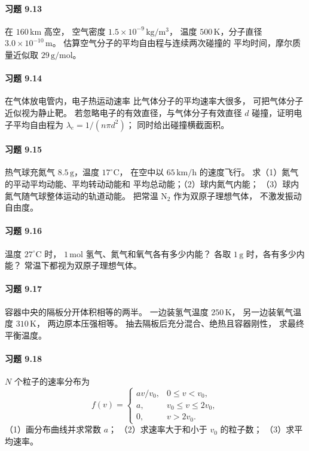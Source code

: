 \paragraph{习题 9.13}
在 \(160\,\mathrm{km}\) 高空，
空气密度 \(1.5\times10^{-9}\,\mathrm{kg/m^3}\)，
温度 \(500\,\mathrm K\)，分子直径
\(3.0\times10^{-10}\,\mathrm m\)。
估算空气分子的平均自由程与连续两次碰撞的
平均时间，摩尔质量近似取 \(29\,\mathrm{g/mol}\)。

\paragraph{习题 9.14}
在气体放电管内，电子热运动速率
比气体分子的平均速率大很多，
可把气体分子近似视为静止靶。
若忽略电子的有效直径，与气体分子有效直径
\(d\) 碰撞，证明电子平均自由程为
\(\lambda_e=1/(n\pi d^2)\)；
同时给出碰撞横截面积。

\paragraph{习题 9.15}
热气球充氮气 \(8.5\,\mathrm g\)，温度
\(17^\circ\mathrm C\)，
在空中以 \(65\,\mathrm{km/h}\) 的速度飞行。
求（1）氮气的平动平均动能、平均转动动能和
平均总动能；（2）球内氮气内能；
（3）球内氮气随气球整体运动的轨道动能。
把常温 \(\mathrm{N_2}\) 作为双原子理想气体，
不激发振动自由度。

\paragraph{习题 9.16}
温度 \(27^\circ\mathrm C\) 时，
\(1\,\mathrm{mol}\) 氢气、氮气和氧气各有多少内能？
各取 \(1\,\mathrm g\) 时，各有多少内能？
常温下都视为双原子理想气体。

\paragraph{习题 9.17}
容器中央的隔板分开体积相等的两半。
一边装氢气温度 \(250\,\mathrm K\)，
另一边装氧气温度 \(310\,\mathrm K\)，
两边原本压强相等。
抽去隔板后充分混合、绝热且容器刚性，
求最终平衡温度。

\paragraph{习题 9.18}
\(N\) 个粒子的速率分布为
\[
 f(v)=\begin{cases}
 av/v_0,&0\le v<v_0,\\
 a,&v_0\le v\le2v_0,\\
 0,&v>2v_0 .
 \end{cases}
\]
（1）画分布曲线并求常数 \(a\)；
（2）求速率大于和小于 \(v_0\) 的粒子数；
（3）求平均速率。

